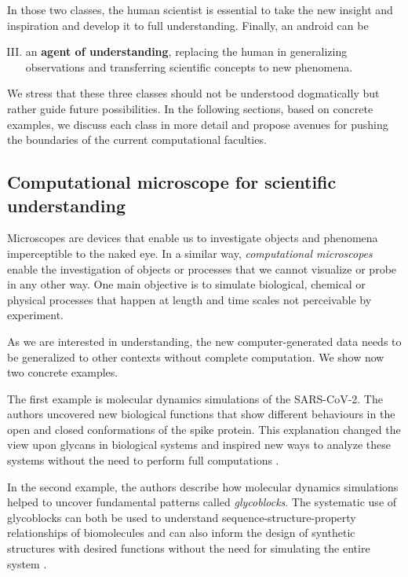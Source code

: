 In those two classes, the human scientist is essential to take the new insight and inspiration and develop it to full understanding. Finally, an android can be

\begin{enumerate}[I)]
\setcounter{enumi}{2}
\item an \textbf{agent of understanding}, replacing the human in generalizing observations and transferring scientific concepts to new phenomena. 
\end{enumerate}

We stress that these three classes should not be understood dogmatically but rather guide future possibilities. In the following sections, based on concrete examples, we discuss each class in more detail and propose avenues for pushing the boundaries of the current computational faculties. 


\subsection{Computational microscope for scientific understanding}
Microscopes are devices that enable us to investigate objects and phenomena imperceptible to the naked eye. In a similar way, \textit{computational microscopes} enable the investigation of objects or processes that we cannot visualize or probe in any other way. One main objective is to simulate biological, chemical or physical processes that happen at length and time scales not perceivable by experiment.

As we are interested in understanding, the new computer-generated data needs to be generalized to other contexts without complete computation\cite{de2005contextual}. We show now two concrete examples.

The first example is molecular dynamics simulations of the SARS-CoV-2. The authors uncovered new biological functions that show different behaviours in the open and closed conformations of the spike protein. This explanation changed the view upon glycans in biological systems and inspired new ways to analyze these systems without the need to perform full computations \cite{casalino2020beyond}.

In the second example, the authors describe how molecular dynamics simulations helped to uncover fundamental patterns called \textit{glycoblocks}. The systematic use of glycoblocks can both be used to understand sequence-structure-property relationships of biomolecules and can also inform the design of synthetic structures with desired functions without the need for simulating the entire system \cite{fogarty2020and}.




